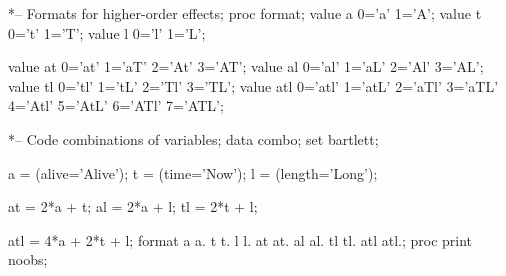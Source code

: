 \begin{listing}
*-- Formats for higher-order effects;
proc format;
   value a  0='a' 1='A';
   value t  0='t' 1='T';
   value l  0='l' 1='L';
   
   value at 0='at' 1='aT' 2='At' 3='AT';
   value al 0='al' 1='aL' 2='Al' 3='AL';
   value tl 0='tl' 1='tL' 2='Tl' 3='TL';
   value atl 0='atl' 1='atL' 2='aTl' 3='aTL' 4='Atl' 5='AtL' 6='ATl' 7='ATL';

*-- Code combinations of variables;
data combo;
   set bartlett;
   
   a = (alive='Alive');
   t = (time='Now');
   l = (length='Long');
   
   at = 2*a + t;
   al = 2*a + l;
   tl = 2*t + l;
   
   atl = 4*a + 2*t + l;
   format a a. t t. l l.  at at.  al al.  tl tl.  atl atl.;
proc print noobs;

\end{listing}
